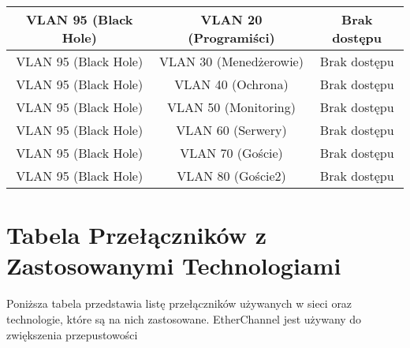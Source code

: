 \begin{table}[htbp]
\begin{tabular}{|c|c|c|}
VLAN 95 (Black Hole)   & VLAN 20 (Programiści)  & Brak dostępu         \\ \hline
VLAN 95 (Black Hole)   & VLAN 30 (Menedżerowie) & Brak dostępu         \\ \hline
VLAN 95 (Black Hole)   & VLAN 40 (Ochrona)      & Brak dostępu         \\ \hline
VLAN 95 (Black Hole)   & VLAN 50 (Monitoring)   & Brak dostępu         \\ \hline
VLAN 95 (Black Hole)   & VLAN 60 (Serwery)      & Brak dostępu         \\ \hline
VLAN 95 (Black Hole)   & VLAN 70 (Goście)       & Brak dostępu         \\ \hline
VLAN 95 (Black Hole)   & VLAN 80 (Goście2)      & Brak dostępu         \\ \hline
\end{tabular}
\end{table}
\newpage

\section{Tabela Przełączników z Zastosowanymi Technologiami}

Poniższa tabela przedstawia listę przełączników używanych w sieci oraz technologie, które są na nich zastosowane. EtherChannel jest używany do zwiększenia przepustowości

